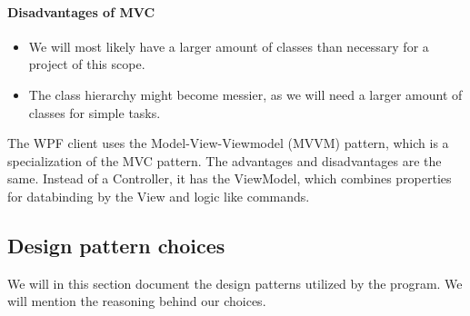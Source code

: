 \paragraph{Disadvantages of MVC}
\begin{itemize}
	\item We will most likely have a larger amount of classes than necessary for a project of this scope. 
	\item The class hierarchy might become messier, as we will need a larger amount of classes for simple tasks. \\
\end{itemize}


The WPF client uses the Model-View-Viewmodel (MVVM) pattern, which is a specialization of the MVC pattern. The advantages and disadvantages are the same. Instead of a Controller, it has the ViewModel, which combines properties for databinding by the View and logic like commands.



\subsection{Design pattern choices}
We will in this section document the design patterns utilized by the program. We will mention the reasoning behind our choices.

